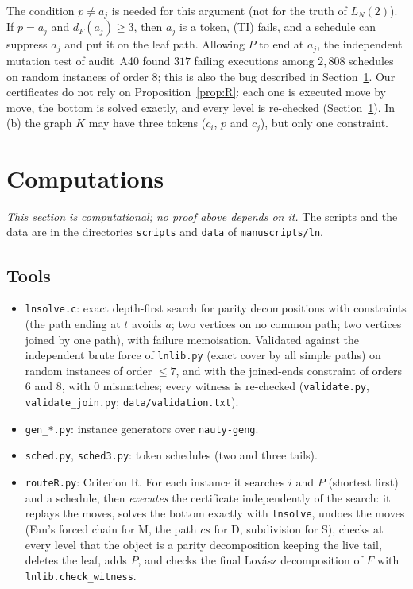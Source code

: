 \documentclass[11pt]{amsart}
\theoremstyle{definition}
\begin{document}
The condition $p\ne a_j$ is needed for this argument (not for the truth of $L_N(2)$). If $p=a_j$
and $d_F(a_j)\ge3$, then $a_j$ is a token, (TI) fails, and a schedule can suppress $a_j$ and put it
on the leaf path. Allowing $P$ to end at $a_j$, the independent
mutation test of audit~A40 found $317$ failing executions among $2{,}808$ schedules on random
instances of order $8$; this is also the bug described in Section~\ref{sec:comp}. Our certificates
do not rely on Proposition~\ref{prop:R}: each one is executed move by move, the bottom is solved
exactly, and every level is re-checked (Section~\ref{sec:comp}). In (b) the graph $K$ may have three
tokens ($c_i$, $p$ and $c_j$), but only one constraint.

\section{Computations}\label{sec:comp}

\emph{This section is computational; no proof above depends on it.} The scripts and the data are in
the directories \texttt{scripts} and \texttt{data} of \texttt{manuscripts/ln}.

\subsection*{Tools}
\begin{itemize}
\item \texttt{lnsolve.c}: exact depth-first search for parity decompositions with constraints
(the path ending at $t$ avoids $a$; two vertices on no common path; two vertices joined by one path),
with failure memoisation. Validated against the independent brute force of \texttt{lnlib.py}
(exact cover by all simple paths) on random instances of order $\le7$, and with the joined-ends
constraint of orders $6$ and $8$, with $0$ mismatches; every witness is re-checked
(\texttt{validate.py}, \texttt{validate\_join.py}; \texttt{data/validation.txt}).
\item \texttt{gen\_*.py}: instance generators over \texttt{nauty-geng}.
\item \texttt{sched.py}, \texttt{sched3.py}: token schedules (two and three tails).
\item \texttt{routeR.py}: Criterion R. For each instance it searches $i$ and $P$ (shortest first) and
a schedule, then \emph{executes} the certificate independently of the search: it replays the moves,
solves the bottom exactly with \texttt{lnsolve}, undoes the moves (Fan's forced chain for M, the path
$c s$ for D, subdivision for S), checks at every level that the object is a parity decomposition
keeping the live tail, deletes the leaf, adds $P$, and checks the final Lov\'asz decomposition of $F$
with \texttt{lnlib.check\_witness}.
\end{itemize}
\end{document}
